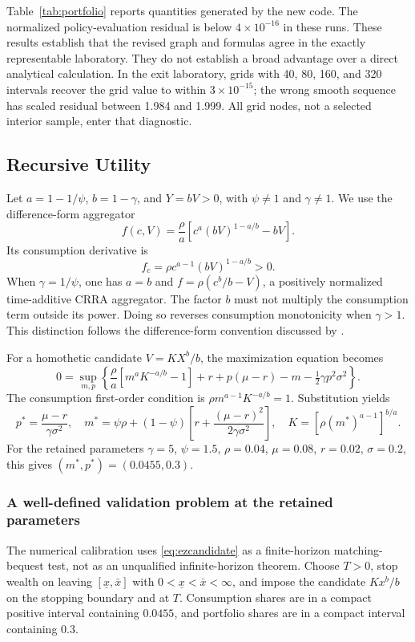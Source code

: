 \documentclass[ecta,nameyear,draft]{econsocart}
\theoremstyle{definition}
\theoremstyle{remark}
\begin{document}
Table~\ref{tab:portfolio} reports quantities generated by the new code. The normalized policy-evaluation residual is below $4\times10^{-16}$ in these runs. These results establish that the revised graph and formulas agree in the exactly representable laboratory. They do not establish a broad advantage over a direct analytical calculation. In the exit laboratory, grids with 40, 80, 160, and 320 intervals recover the grid value to within $3\times10^{-15}$; the wrong smooth sequence has scaled residual between 1.984 and 1.999. All grid nodes, not a selected interior sample, enter that diagnostic.

\subsection{Recursive Utility}\label{sec:recursive}
Let $a=1-1/\psi$, $b=1-\gamma$, and $Y=bV>0$, with $\psi\ne1$ and $\gamma\ne1$. We use the difference-form aggregator
\begin{equation}\label{eq:ez}
 f(c,V)=\frac\rho a\left[c^a(bV)^{1-a/b}-bV\right].
\end{equation}
Its consumption derivative is
\begin{equation}\label{eq:ezderivative}
 f_c=\rho c^{a-1}(bV)^{1-a/b}>0.
\end{equation}
When $\gamma=1/\psi$, one has $a=b$ and $f=\rho(c^b/b-V)$, a positively normalized time-additive CRRA aggregator. The factor $b$ must not multiply the consumption term outside its power. Doing so reverses consumption monotonicity when $\gamma>1$. This distinction follows the difference-form convention discussed by \citet{herdegen2021}.

For a homothetic candidate $V=KX^b/b$, the maximization equation becomes
\begin{equation}\label{eq:eznormalized}
 0=\sup_{m,p}\left\{\frac\rho a[m^aK^{-a/b}-1]
       +r+p(\mu-r)-m-\tfrac12\gamma p^2\sigma^2\right\}.
\end{equation}
The consumption first-order condition is $\rho m^{a-1}K^{-a/b}=1$. Substitution yields
\begin{equation}\label{eq:ezcandidate}
 p^*=\frac{\mu-r}{\gamma\sigma^2},\quad
 m^*=\psi\rho+(1-\psi)\left[r+\frac{(\mu-r)^2}{2\gamma\sigma^2}\right],\quad
 K=[\rho(m^*)^{a-1}]^{b/a}.
\end{equation}
For the retained parameters $\gamma=5$, $\psi=1.5$, $\rho=0.04$, $\mu=0.08$, $r=0.02$, $\sigma=0.2$, this gives $(m^*,p^*)=(0.0455,0.3)$.

\subsubsection{A well-defined validation problem at the retained parameters}
The numerical calibration uses \eqref{eq:ezcandidate} as a finite-horizon matching-bequest test, not as an unqualified infinite-horizon theorem. Choose $T>0$, stop wealth on leaving $[\underline x,\bar x]$ with $0<\underline x<\bar x<\infty$, and impose the candidate $Kx^b/b$ on the stopping boundary and at $T$. Consumption shares are in a compact positive interval containing $0.0455$, and portfolio shares are in a compact interval containing $0.3$.
\end{document}
